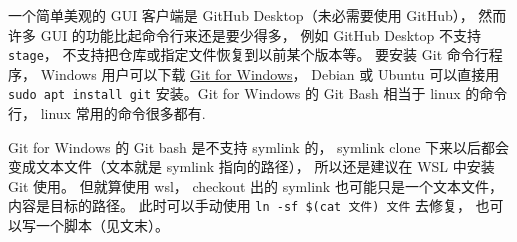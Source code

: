 

一个简单美观的 GUI 客户端是 GitHub Desktop（未必需要使用 GitHub）， 然而许多 GUI 的功能比起命令行来还是要少得多， 例如 GitHub Desktop 不支持 \verb|stage|， 不支持把仓库或指定文件恢复到以前某个版本等。 要安装 Git 命令行程序， Windows 用户可以下载 \href{https://gitforwindows.org/}{Git for Windows}， Debian 或 Ubuntu 可以直接用 \verb|sudo apt install git| 安装。Git for Windows 的 Git Bash 相当于 linux 的命令行， linux 常用的命令很多都有.

Git for Windows 的 Git bash 是不支持 symlink 的， symlink clone 下来以后都会变成文本文件（文本就是 symlink 指向的路径）， 所以还是建议在 WSL 中安装 Git 使用。 但就算使用 wsl， checkout 出的 symlink 也可能只是一个文本文件， 内容是目标的路径。 此时可以手动使用 \verb|ln -sf $(cat 文件) 文件| 去修复， 也可以写一个脚本（见文末）。

